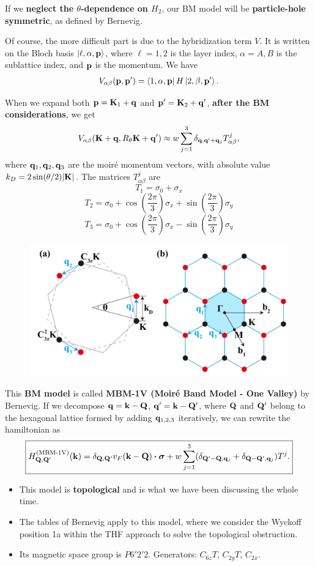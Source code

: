 If we \textbf{neglect the $\theta$-dependence on $H_2$}, our BM model will be \textbf{particle-hole symmetric}, as defined by Bernevig.

\n

Of course, the more difficult part is due to the hybridization term $V$. It is written on the Bloch basis $\ket{\ell, \alpha, {\vb{p}}}$, where $\ell = 1, 2$ is the layer index, $\alpha = A, B$ is the sublattice index, and ${\vb{p}}$ is the momentum.
We have
$$
V_{\alpha\beta}({\vb{p}}, {\vb{p}}') = \bra{1, \alpha, {\vb{p}}} H \ket{2, \beta, {\vb{p}}'}.
$$

When we expand both ${\vb{p}} = {\vb{K}}_1 + {\vb{q}}$ and ${\vb{p}}' = {\vb{K}}_2 + {\vb{q}}'$, \textbf{after the BM considerations}, we get
$$
V_{\alpha\beta}({\vb{K}} + {\vb{q}}, R_\theta {\vb{K}} + {\vb{q}}') \approx
w \sum_{j=1}^{3} \delta_{{\vb{q}}, {\vb{q}}' + {\vb{q}}_j} T_{\alpha\beta}^j,
$$
where ${\vb{q}}_1, {\vb{q}}_2, {\vb{q}}_3$ are the moiré momentum vectors, with absolute value $k_D = 2 \sin(\theta/2) \abs{{\vb{K}}}$. The matrices $T^j_{\alpha\beta}$ are
$$
T_1 = \sigma_0 + \sigma_x
$$
$$
T_2 = \sigma_0 + \cos(\frac{2\pi}{3}) \sigma_x + \sin(\frac{2\pi}{3}) \sigma_y
$$
$$
T_3 = \sigma_0 + \cos(\frac{2\pi}{3}) \sigma_x - \sin(\frac{2\pi}{3}) \sigma_y
$$
\begin{figure}[H]
\centering
\includegraphics[width=0.8\linewidth]{fig/moire-vectors.png}
\end{figure}

\n

This \textbf{BM model} is called \textbf{MBM-1V (Moiré Band Model - One Valley)} by Bernevig. If we decompose ${\vb{q}} = {\vb{k}} - {\vb{Q}}$, ${\vb{q}}'={\vb{k}}-{\vb{Q}}'$, where ${\vb{Q}}$ and ${\vb{Q}}'$ belong to the hexagonal lattice formed by adding ${\vb{q}}_{1,2,3}$ iteratively, we can rewrite the hamiltonian as
$$
\boxed{
H_{\Q, \Q'}^{(\text{MBM-1V})}(\k) =
\delta_{\Q,\Q'} v_F (\k-\Q) \vdot \bm{\sigma}
+ w \sum_{j=1}^{3} (\delta_{\Q'-\Q, \q_j} + \delta_{\Q-\Q', \q_j}) T^j.
}
$$

\begin{itemize}
\item This model is \textbf{topological} and is what we have been discussing the whole time.
\item The tables of Bernevig apply to this model, where we consider the Wyckoff position 1a within the THF approach to solve the topological obstruction.
\item Its magnetic space group is $P6'2'2$. Generators: $C_{6z} T$, $C_{2y} T$, $C_{2x}$.
\end{itemize}

